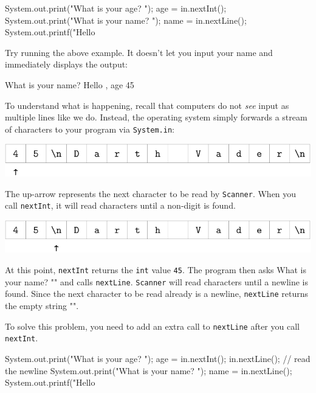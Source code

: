 \documentclass[12pt]{book}
\theoremstyle{exercise}
\newcommand{\java}[1]{\verb"#1"}
\newcommand{\java}[1]{\lstinline{#1}} %
\begin{document}
\begin{code}
    System.out.print("What is your age? ");
    age = in.nextInt();
    System.out.print("What is your name? ");
    name = in.nextLine();
    System.out.printf("Hello %
\end{code}

Try running the above example.
It doesn't let you input your name and immediately displays the output:

\begin{stdout}
What is your name? Hello , age 45
\end{stdout}

To understand what is happening, recall that computers do not {\em see} input as multiple lines like we do.
Instead, the operating system simply forwards a stream of characters to your program via \java{System.in}:

\begin{center}
\includegraphics{figs/vader1.pdf}
\end{center}

The up-arrow represents the next character to be read by \java{Scanner}.
When you call \java{nextInt}, it will read characters until a non-digit is found.

\begin{center}
\includegraphics{figs/vader2.pdf}
\end{center}

At this point, \java{nextInt} returns the \java{int} value \java{45}.
The program then asks \java{"What is your name? "} and calls \java{nextLine}.
\java{Scanner} will read characters until a newline is found.
Since the next character to be read already is a newline, \java{nextLine} returns the empty string \java{""}.

To solve this problem, you need to add an extra call to \java{nextLine} after you call \java{nextInt}.

\begin{code}
    System.out.print("What is your age? ");
    age = in.nextInt();
    in.nextLine();  // read the newline
    System.out.print("What is your name? ");
    name = in.nextLine();
    System.out.printf("Hello %
\end{code}
\end{document}
